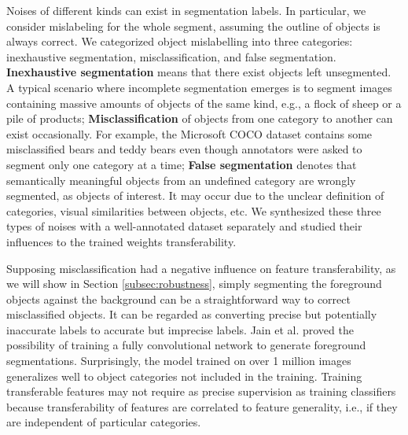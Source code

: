 
Noises of different kinds can exist in segmentation labels. %
In particular, we consider mislabeling for the whole segment, assuming the outline of objects is always correct.
We categorized object mislabelling into three categories: inexhaustive segmentation, misclassification, and false segmentation.
\textbf{Inexhaustive segmentation} means that there exist objects left unsegmented.
A typical scenario where incomplete segmentation emerges is to segment images containing massive amounts of objects of the same kind, e.g., a flock of sheep or a pile of products;
\textbf{Misclassification} of objects from one category to another can exist occasionally.
For example, the Microsoft COCO dataset\cite{lin2014microsoft} contains some misclassified bears and teddy bears even though annotators were asked to segment only one category at a time;
\textbf{False segmentation} denotes that semantically meaningful objects from an undefined category are wrongly segmented, as objects of interest.
It may occur due to the unclear definition of categories, visual similarities between objects, etc.
We synthesized these three types of noises with a well-annotated dataset separately and studied their influences to the trained weights transferability.




Supposing misclassification had a negative influence on feature transferability, as we will show in Section \ref{subsec:robustness}, simply segmenting the foreground objects against the background can be a straightforward way to correct misclassified objects.
It can be regarded as converting precise but potentially inaccurate labels to accurate but imprecise labels.
Jain et al.\cite{jain2017pixel} proved the possibility of training a fully convolutional network to generate foreground segmentations.
Surprisingly, the model trained on over 1 million images generalizes well to object categories not included in the training.
Training transferable features may not require as precise supervision as training classifiers because transferability of features are correlated to feature generality, i.e., if they are independent of particular categories\cite{yosinski2014transferable}.


